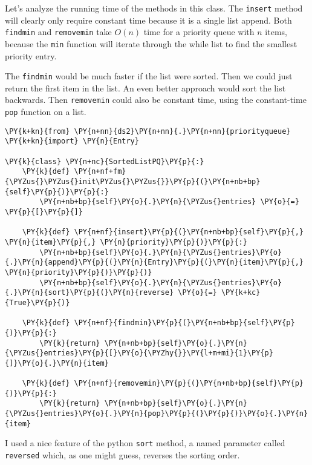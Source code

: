 Let's analyze the running time of the methods in this class.
The \texttt{insert} method will clearly only require constant time because it is a single list append.  Both \texttt{findmin} and \texttt{removemin} take $O(n)$ time for a priority queue with $n$ items, because the \texttt{min} function will iterate through the while list to find the smallest priority entry.


The \texttt{findmin} would be much faster if the list were sorted.  Then we could just return the first item in the list.  An even better approach would sort the list backwards.  Then \texttt{removemin} could also be constant time, using the constant-time \texttt{pop} function on a list.

\begin{Verbatim}[commandchars=\\\{\}]
\PY{k+kn}{from} \PY{n+nn}{ds2}\PY{n+nn}{.}\PY{n+nn}{priorityqueue} \PY{k+kn}{import} \PY{n}{Entry}

\PY{k}{class} \PY{n+nc}{SortedListPQ}\PY{p}{:}
    \PY{k}{def} \PY{n+nf+fm}{\PYZus{}\PYZus{}init\PYZus{}\PYZus{}}\PY{p}{(}\PY{n+nb+bp}{self}\PY{p}{)}\PY{p}{:}
        \PY{n+nb+bp}{self}\PY{o}{.}\PY{n}{\PYZus{}entries} \PY{o}{=} \PY{p}{[}\PY{p}{]}

    \PY{k}{def} \PY{n+nf}{insert}\PY{p}{(}\PY{n+nb+bp}{self}\PY{p}{,} \PY{n}{item}\PY{p}{,} \PY{n}{priority}\PY{p}{)}\PY{p}{:}
        \PY{n+nb+bp}{self}\PY{o}{.}\PY{n}{\PYZus{}entries}\PY{o}{.}\PY{n}{append}\PY{p}{(}\PY{n}{Entry}\PY{p}{(}\PY{n}{item}\PY{p}{,} \PY{n}{priority}\PY{p}{)}\PY{p}{)}
        \PY{n+nb+bp}{self}\PY{o}{.}\PY{n}{\PYZus{}entries}\PY{o}{.}\PY{n}{sort}\PY{p}{(}\PY{n}{reverse} \PY{o}{=} \PY{k+kc}{True}\PY{p}{)}

    \PY{k}{def} \PY{n+nf}{findmin}\PY{p}{(}\PY{n+nb+bp}{self}\PY{p}{)}\PY{p}{:}
        \PY{k}{return} \PY{n+nb+bp}{self}\PY{o}{.}\PY{n}{\PYZus{}entries}\PY{p}{[}\PY{o}{\PYZhy{}}\PY{l+m+mi}{1}\PY{p}{]}\PY{o}{.}\PY{n}{item}

    \PY{k}{def} \PY{n+nf}{removemin}\PY{p}{(}\PY{n+nb+bp}{self}\PY{p}{)}\PY{p}{:}
        \PY{k}{return} \PY{n+nb+bp}{self}\PY{o}{.}\PY{n}{\PYZus{}entries}\PY{o}{.}\PY{n}{pop}\PY{p}{(}\PY{p}{)}\PY{o}{.}\PY{n}{item}
\end{Verbatim}



I used a nice feature of the python \texttt{sort} method, a named parameter called \texttt{reversed} which, as one might guess, reverses the sorting order.

